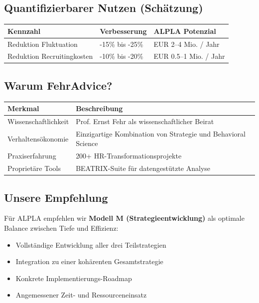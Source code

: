 \documentclass[11pt,a4paper]{article}
\begin{document}
\subsection{Quantifizierbarer Nutzen (Schätzung)}

\begin{table}[h]
\centering
\begin{tabular}{lll}
\toprule
\textbf{Kennzahl} & \textbf{Verbesserung} & \textbf{ALPLA Potenzial} \\
\midrule
Reduktion Fluktuation & -15\% bis -25\% & EUR 2--4 Mio. / Jahr \\
Reduktion Recruitingkosten & -10\% bis -20\% & EUR 0.5--1 Mio. / Jahr \\
\bottomrule
\end{tabular}
\end{table}

\newpage

\subsection{Warum FehrAdvice?}

\begin{table}[h]
\centering
\begin{tabular}{p{4cm}p{9cm}}
\toprule
\textbf{Merkmal} & \textbf{Beschreibung} \\
\midrule
Wissenschaftlichkeit & Prof. Ernst Fehr als wissenschaftlicher Beirat \\
Verhaltensökonomie & Einzigartige Kombination von Strategie und Behavioral Science \\
Praxiserfahrung & 200+ HR-Transformationsprojekte \\
Proprietäre Tools & BEATRIX-Suite für datengestützte Analyse \\
\bottomrule
\end{tabular}
\end{table}

\subsection{Unsere Empfehlung}

Für ALPLA empfehlen wir \textbf{Modell M (Strategieentwicklung)} als optimale Balance zwischen Tiefe und Effizienz:

\begin{itemize}
    \item[$\checkmark$] Vollständige Entwicklung aller drei Teilstrategien
    \item[$\checkmark$] Integration zu einer kohärenten Gesamtstrategie
    \item[$\checkmark$] Konkrete Implementierungs-Roadmap
    \item[$\checkmark$] Angemessener Zeit- und Ressourceneinsatz
\end{itemize}
\end{document}
